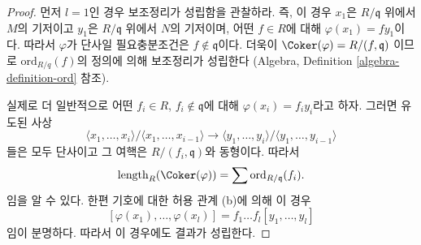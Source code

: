 \begin{proof}
먼저 $l = 1$인 경우 보조정리가 성립함을 관찰하라. 즉, 이 경우
$x_1$은 $R/\mathfrak q$ 위에서 $M$의 기저이고 $y_1$은
$R/\mathfrak q$ 위에서 $N$의 기저이며, 어떤 $f \in R$에 대해
$\varphi(x_1) = fy_1$이다. 따라서 $\varphi$가 단사일 필요충분조건은
$f \not \in \mathfrak q$이다. 더욱이 $\Coker(\varphi) = R/(f, \mathfrak q)$
이므로 $\text{ord}_{R/q}(f)$의 정의에 의해 보조정리가 성립한다
(Algebra, Definition \ref{algebra-definition-ord} 참조).

\medskip\noindent
실제로 더 일반적으로 어떤 $f_i \in R$, $f_i \not \in \mathfrak q$에
대해 $\varphi(x_i) = f_iy_i$라고 하자. 그러면 유도된 사상
$$
\langle x_1, \ldots, x_i\rangle / \langle x_1, \ldots, x_{i - 1}\rangle
\longrightarrow
\langle y_1, \ldots, y_i\rangle / \langle y_1, \ldots, y_{i - 1}\rangle
$$
들은 모두 단사이고 그 여핵은 $R/(f_i, \mathfrak q)$와 동형이다.
따라서
$$
\text{length}_R(\Coker(\varphi)) = \sum \text{ord}_{R/\mathfrak q}(f_i).
$$
임을 알 수 있다. 한편 기호에 대한 허용 관계 (b)에 의해 이 경우
$$
[\varphi(x_1), \ldots, \varphi(x_l)] = f_1 \ldots f_l [y_1, \ldots, y_l]
$$
임이 분명하다. 따라서 이 경우에도 결과가 성립한다.


\end{proof}

